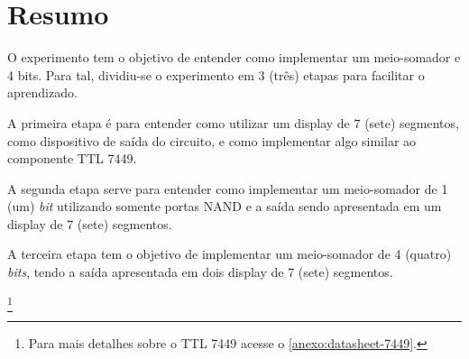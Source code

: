 \chapter{Resumo}

O experimento tem o objetivo de entender como implementar um meio-somador e 4 bits. Para tal, dividiu-se
o experimento em 3 (três) etapas para facilitar o aprendizado.

A primeira etapa é para entender como utilizar um display de 7 (sete) segmentos, como dispositivo
de saída do circuito, e como
implementar algo similar ao componente TTL 7449.

A segunda etapa serve para entender como implementar um meio-somador de 1 (um) \textit{bit} utilizando
somente portas NAND e a saída sendo apresentada em um display de 7 (sete) segmentos.

A terceira etapa tem o objetivo de implementar um meio-somador de 4 (quatro) \textit{bits}, tendo
 a saída apresentada em dois display de 7 (sete) segmentos.

\footnote{Para mais detalhes sobre o TTL 7449 acesse o \autoref{anexo:datasheet-7449}.}
